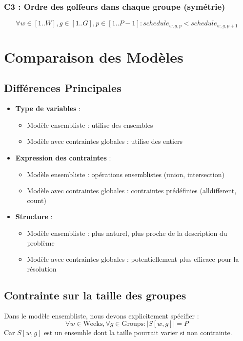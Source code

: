 \documentclass{article}
\begin{document}
\subsubsection{C3 : Ordre des golfeurs dans chaque groupe (symétrie)}
\[
\forall w \in [1..W], g \in [1..G], p \in [1..P-1] : schedule_{w,g,p} < schedule_{w,g,p+1}
\]

\section{Comparaison des Modèles}

\subsection{Différences Principales}
\begin{itemize}
   \item \textbf{Type de variables} :
       \begin{itemize}
           \item Modèle ensembliste : utilise des ensembles
           \item Modèle avec contraintes globales : utilise des entiers
       \end{itemize}
   \item \textbf{Expression des contraintes} :
       \begin{itemize}
           \item Modèle ensembliste : opérations ensemblistes (union, intersection)
           \item Modèle avec contraintes globales : contraintes prédéfinies (alldifferent, count)
       \end{itemize}
   \item \textbf{Structure} :
       \begin{itemize}
           \item Modèle ensembliste : plus naturel, plus proche de la description du problème
           \item Modèle avec contraintes globales : potentiellement plus efficace pour la résolution
       \end{itemize}
\end{itemize}

\subsection{Contrainte sur la taille des groupes}
Dans le modèle ensembliste, nous devons explicitement spécifier :
\[
\forall w \in \text{Weeks}, \forall g \in \text{Groups} : |S[w,g]| = P
\]
Car $S[w,g]$ est un ensemble dont la taille pourrait varier si non contrainte.
\end{document}
